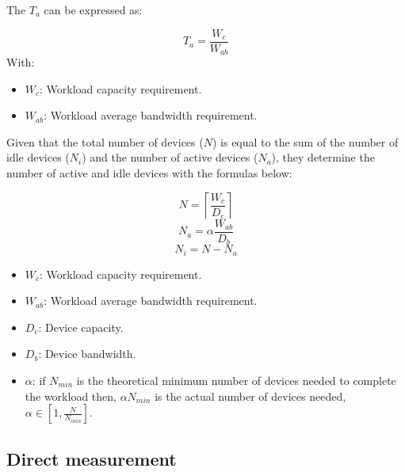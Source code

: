 The $T_a$ can be expressed as: 

\begin{equation}
    T_a = \frac{W_c}{W_{ab}}
\end{equation}
With:
\begin{itemize}
    \item $W_c$: Workload capacity requirement.
    \item $W_{ab}$: Workload average bandwidth requirement.
\end{itemize}

Given that the total number of devices ($N$) is equal to the sum of the number of idle devices ($N_i$) and the number of active devices ($N_a$), they determine the number of active and idle devices with the formulas below:

\begin{equation}
    N = \left \lceil {\frac{W_c}{D_c}} \right \rceil
\end{equation}
\begin{equation}
    N_a = \alpha \frac{W_{ab}}{D_b}
\end{equation}
\begin{equation}
    N_i = N - N_a
\end{equation}

\begin{itemize}
    \item $W_c$: Workload capacity requirement.
    \item $W_{ab}$: Workload average bandwidth requirement.
    \item $D_c$: Device capacity.
    \item $D_b$: Device bandwidth.
    \item $\alpha$: if $N_{min}$ is the theoretical minimum number of devices needed to complete the workload then, $\alpha N_{min}$ is the actual number of devices needed, $\alpha \in [1,\frac{N}{N_{min}}]$.
\end{itemize}


\subsection{Direct measurement}



